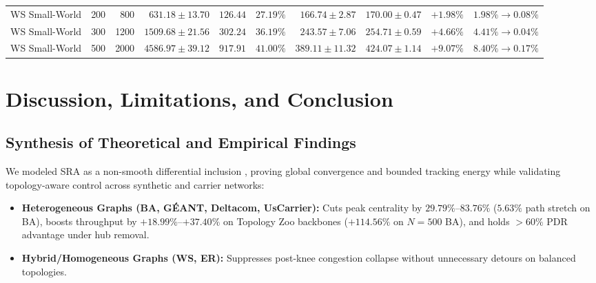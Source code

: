 \documentclass{ccjnl}
\newcommand{\rev}[1]{#1}
\def\rev#1{#1}%
\begin{document}
\begin{table}[t]
\begin{tabular*}{\textwidth}{@{\extracolsep{\fill}}lrrrrrrrrr@{}}
WS Small-World & 200 & 800 & $631.18 \pm 13.70$ & $126.44$ & $27.19\%$ & $166.74 \pm 2.87$ & $170.00 \pm 0.47$ & $+1.98\%$ & $1.98\% \to 0.08\%$ \\
WS Small-World & 300 & 1200 & $1509.68 \pm 21.56$ & $302.24$ & $36.19\%$ & $243.57 \pm 7.06$ & $254.71 \pm 0.59$ & $+4.66\%$ & $4.41\% \to 0.04\%$ \\
WS Small-World & 500 & 2000 & $4586.97 \pm 39.12$ & $917.91$ & $41.00\%$ & $389.11 \pm 11.32$ & $424.07 \pm 1.14$ & $+9.07\%$ & $8.40\% \to 0.17\%$ \\
\bottomrule
\end{tabular*}
\end{table}

\section{Discussion, \rev{Limitations,} and Conclusion}
\label{sec:discussion_conclusion}

\subsection{\rev{Synthesis of Theoretical and Empirical Findings}}
We modeled SRA as a non-smooth differential inclusion \cite{Aubin1984Differential}, proving global convergence and bounded tracking energy while validating topology-aware control across synthetic and carrier networks:
\begin{itemize}
    \item \textbf{Heterogeneous Graphs (BA, G\'EANT, Deltacom, UsCarrier):} Cuts peak centrality by $29.79\%$--$83.76\%$ ($5.63\%$ path stretch on BA), boosts throughput by $+18.99\%$--$+37.40\%$ on Topology Zoo backbones ($+114.56\%$ on $N=500$ BA), and holds $>60\%$ PDR advantage under hub removal.
    \item \textbf{Hybrid/Homogeneous Graphs (WS, ER):} Suppresses post-knee congestion collapse without unnecessary detours on balanced topologies.
\end{itemize}
\end{document}
